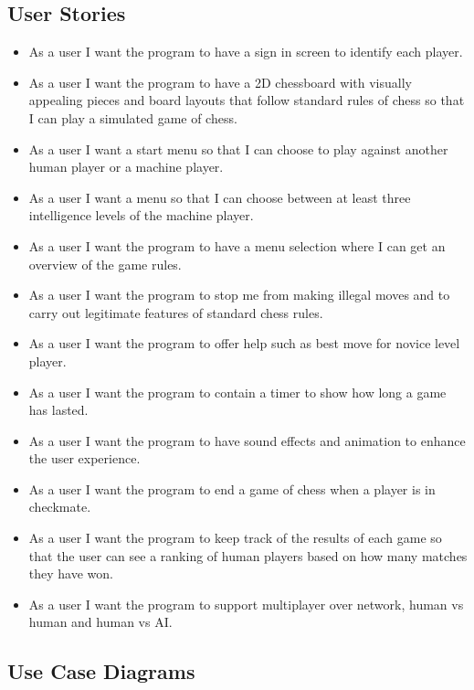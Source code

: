 \documentclass{article}
\begin{document}
\subsection{User Stories}
	\begin{itemize}
	\item As a user I want the program to have a sign in screen to identify each player.
	\item As a user I want the program to have a 2D chessboard with visually appealing pieces and board layouts that follow standard rules of chess so that I can play a simulated game of chess.
	\item As a user I want a start menu so that I can choose to play against another human player or a machine player.
	\item As a user I want a menu so that I can choose between at least three intelligence levels of the machine player.
	\item As a user I want the program to have a menu selection where I can get an overview of the game rules.
	\item As a user I want the program to stop me from making illegal moves and to carry out legitimate features of standard chess rules.
	\item As a user I want the program to offer help such as best move for novice level player.
	\item As a user I want the program to contain a timer to show how long a game has lasted.
	\item As a user I want the program to have sound effects and animation to enhance the user experience.
	\item As a user I want the program to end a game of chess when a player is in checkmate.
	\item As a user I want the program to keep track of the results of each game so that the user can see a ranking of human players based on how many matches they have won.
	\item As a user I want the program to support multiplayer over network, human vs human and human vs AI.   
	
	
	\end{itemize}

\newpage
\subsection{Use Case Diagrams}
\end{document}

